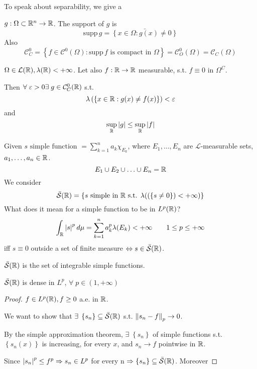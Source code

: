 To speak about separability, we give a 
\begin{definition}
    \(g: \Omega \subset \mathbb{R}^n \to \mathbb{R}\). The support of \(g\) is
    \[
      \mbox{supp}\, g = \bar{\left\{ x \in \Omega : g(x) \neq 0 \right\}}
    \]
    Also 
    \[
        \mathcal{C}^0_C = \left\{ f \in \mathcal{C}^0\left( \Omega \right) : \mbox{supp} \, f \mbox{ is compact in } \Omega\right\} = \mathcal{C}^0_O(\Omega) = \mathcal{C}_C(\Omega)
    \]
\end{definition}
\begin{theorem}
    \(\Omega \in \mathcal{L}(\mathbb{R}), \lambda(\mathbb{R}) < +\infty\). Let also \(f : \mathbb{R} \to \mathbb{R}\) measurable, s.t. \(f\equiv 0\) in \(\Omega^C\).

    Then \(\forall \; \varepsilon > 0 \exists \; g \in \mathcal{C}^0_C(\mathbb{R})\) s.t.
    \[
        \lambda \left( \left\{ x \in \mathbb{R} : g(x) \neq f(x) \right\} \right) < \varepsilon
    \]
    and
    \[
        \sup_{\mathbb{R}} \abs{g} \leq \sup_{\mathbb{R}} \abs{f}
    \]
\end{theorem}
\begin{definition}
    Given \(s \mbox{ simple function } = \sum_{k=1}^n a_k \chi_{E_k}\), where \(E_1, \ldots, E_n\) are \(\mathcal{L}\)-measurable sets, \(a_1, \ldots, a_n \in \mathbb{R}\). 
    \[
        E_1 \cup E_2 \cup \ldots \cup E_n = \mathbb{R}
    \]
    We consider
    \[
        \bar{\mathcal{S}}(\mathbb{R}) = \left\{ s \mbox{ simple in } \mathbb{R} \mbox{ s.t. } \lambda(\left( \left\{ s \neq 0 \right\} \right) < +\infty) \right\}
    \]
    What does it mean for a simple function to be in \(L^p(\mathbb{R})\)? 
    \[
        \int_{\mathbb{R}} \abs{s}^p \, d\mu = \sum_{k=1}^n a_k^p \lambda(E_k) < +\infty
    \tag*{\(1 \leq p \leq +\infty\)}\]
    iff \(s \equiv 0\) outside a set of finite measure \(\Leftrightarrow s \in \bar{\mathcal{S}}(\mathbb{R})\).

    \(\bar{\mathcal{S}}(\mathbb{R})\) is the set of integrable simple functions.
\end{definition}
\begin{theorem}
    \(\bar{\mathcal{S}}(\mathbb{R})\) is dense in \(L^p\), \(\forall \; p \in (1, +\infty)\)
\end{theorem}
\begin{proof}
    \(f \in L^p(\mathbb{R}), f \geq 0\) a.e. in \(\mathbb{R}\).

    We want to show that \(\exists \; \left\{ s_n \right\} \subseteq \bar{\mathcal{S}}(\mathbb{R})\) s.t. \(\norm{s_n - f}_p \to 0\).

    By the simple approximation theorem, \(\exists \; \left\{ s_n \right\}\) of simple functions s.t. \(\left\{ s_n(x) \right\}\) is increasing, for every \(x\), and \(s_n \to f\) pointwise in \(\mathbb{R}\).

    Since \(\abs{s_n}^p \leq f^p \Rightarrow s_n \in L^p\) for every n \(\Rightarrow \left\{ s_n \right\} \subseteq \bar{\mathcal{S}}(\mathbb{R})\). Moreover


\end{proof}
